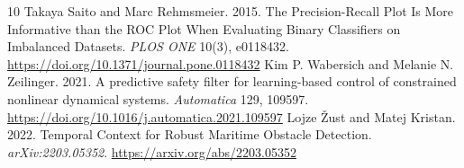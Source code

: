 \documentclass[sigconf,nonacm]{acmart}
\begin{document}
\begin{thebibliography}{10}
 Takaya Saito and Marc Rehmsmeier. 2015. The Precision-Recall Plot Is More Informative than the ROC Plot When Evaluating Binary Classifiers on Imbalanced Datasets. \emph{PLOS ONE} 10(3), e0118432. \url{https://doi.org/10.1371/journal.pone.0118432}
 Kim P. Wabersich and Melanie N. Zeilinger. 2021. A predictive safety filter for learning-based control of constrained nonlinear dynamical systems. \emph{Automatica} 129, 109597. \url{https://doi.org/10.1016/j.automatica.2021.109597}
 Lojze \v{Z}ust and Matej Kristan. 2022. Temporal Context for Robust Maritime Obstacle Detection. \emph{arXiv:2203.05352}. \url{https://arxiv.org/abs/2203.05352}
\end{thebibliography}
\end{document}
